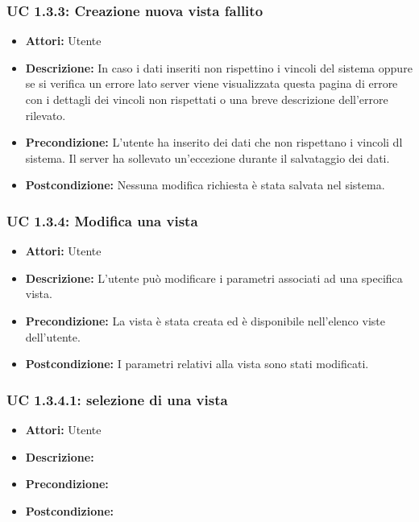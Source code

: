 \subsubsection{UC 1.3.3: Creazione nuova vista fallito}

\begin{itemize}
\item \textbf{Attori:} Utente
\item \textbf{Descrizione:} In caso i dati inseriti non rispettino i vincoli del sistema oppure se si verifica un errore lato server viene visualizzata questa pagina di errore con i dettagli dei vincoli non rispettati o una breve descrizione dell'errore rilevato.
\item \textbf{Precondizione:} L'utente ha inserito dei dati che non rispettano i vincoli dl sistema.
Il server ha sollevato un'eccezione durante il salvataggio dei dati.
\item \textbf{Postcondizione:} Nessuna modifica richiesta è stata salvata nel sistema.
\end{itemize}

\subsubsection{UC 1.3.4: Modifica una vista}

\begin{itemize}
\item \textbf{Attori:} Utente
\item \textbf{Descrizione:} L'utente può modificare i parametri associati ad una specifica vista.
\item \textbf{Precondizione:} La vista è stata creata ed è disponibile nell'elenco viste dell'utente.
\item \textbf{Postcondizione:} I parametri relativi alla vista sono stati modificati.
\end{itemize}

\subsubsection{UC 1.3.4.1: selezione di una vista}

\begin{itemize}
\item \textbf{Attori:} Utente
\item \textbf{Descrizione:} 
\item \textbf{Precondizione:} 
\item \textbf{Postcondizione:} 
\end{itemize}

